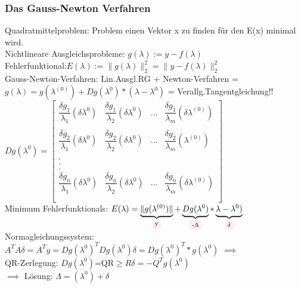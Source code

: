 \documentclass[../ZF_HM2.tex]{subfiles}
\begin{document}
\subsubsection{Das Gauss-Newton Verfahren}
\textcolor {pink!200}{Quadratmittelproblem:} Problem einen Vektor x zu finden für den E(x) minimal wird.\\
\textcolor{violet!30}{Nichtlineare Ausgleichsprobleme:} \colorbox {magenta!30}{$g(\lambda):=y-f(\lambda)$}\\
\textcolor{orange!50}{Fehlerfunktional:}\colorbox {magenta!30}{$E(\lambda):=\|g(\lambda)\|_2^2=\|y-f(\lambda)\|_2^2$}\\
\textcolor{teal!50}{Gauss-Newton-Verfahren:} Lin.Ausgl.RG + Newton-Verfahren = \colorbox{magenta!30}{$g(\lambda)=g(\lambda^{(0)})+Dg(\lambda^{0})*(\lambda - \lambda^{0})$} = Verallg.Tangentgleichung!!\\
$Dg(\lambda^{0})=\left[\begin{matrix}
\dfrac{\delta g_1}{\lambda_1}(\delta\lambda^{0}) & \dfrac{\delta g_1}{\lambda_2}(\delta\lambda^{0}) & ...& \dfrac{\delta g_1}{\lambda_m}(\delta\lambda^{(0)})\\\\
\dfrac{\delta g_2}{\lambda_1}(\delta\lambda^{0}) & \dfrac{\delta g_2}{\lambda_2}(\delta\lambda^{0}) & ...& \dfrac{\delta g_2}{\lambda_m}(\lambda^{(0)})\\\\
.\\
.\\
.\\
\dfrac{\delta g_n}{\lambda_1}(\delta\lambda^{0}) & \dfrac{\delta g_n}{\lambda_2}(\delta\lambda^{0}) & ...& \dfrac{\delta g_n}{\lambda_m}(\delta\lambda^{(0)})\\\\

\end{matrix}\right]$\\
Minimum Fehlerfunktionals: $E(\lambda) = 
\underbrace{\|g(\lambda^{(0)})\|}_\text{\colorbox{pink!30}{y}}+ 
\underbrace{Dg(\lambda^{0})}_\text{\colorbox{pink!30}{-A}}*
\underbrace{\lambda - \lambda^{0})}_\text{\colorbox{pink!30}{$\delta$}}$\\
\colorbox{blue!30}{Normagleichungssystem:}$A^{T}A\delta = A^{T}y = Dg(\lambda^{0})^{T}Dg(\lambda^{0})\delta=Dg(\lambda^{0})^{T}*g(\lambda^{0})$
$\implies$\\ QR-Zerlegung: $Dg(\lambda^{0})$=QR$\geq R\delta = -Q^{T}g(\lambda^{0})$\\
$\implies$ Lösung: $\Lambda = (\lambda^{0})+\delta$
\end{document}
